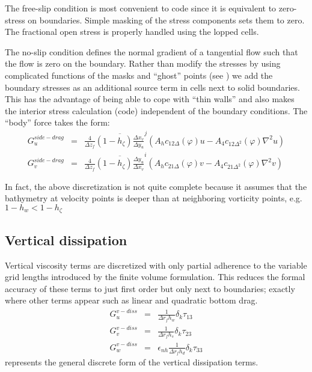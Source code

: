 The free-slip condition is most convenient to code since it is
equivalent to zero-stress on boundaries. Simple masking of the stress
components sets them to zero. The fractional open stress is properly
handled using the lopped cells.

The no-slip condition defines the normal gradient of a tangential flow
such that the flow is zero on the boundary. Rather than modify the
stresses by using complicated functions of the masks and ``ghost''
points (see \cite{adcroft:98}) we add the boundary stresses as
an additional source term in cells next to solid boundaries. This has
the advantage of being able to cope with ``thin walls'' and also makes
the interior stress calculation (code) independent of the boundary
conditions. The ``body'' force takes the form:
\begin{eqnarray}
G_u^{side-drag} & = &
\frac{4}{\Delta z_f} \overline{ (1-h_\zeta) \frac{\Delta x_v}{\Delta y_u} }^j
\left( A_h c_{12\Delta}(\varphi) u - A_4 c_{12\Delta^2}(\varphi) \nabla^2 u \right)
\\
G_v^{side-drag} & = &
\frac{4}{\Delta z_f} \overline{ (1-h_\zeta) \frac{\Delta y_u}{\Delta x_v} }^i
\left( A_h c_{21\Delta}(\varphi) v - A_4 c_{21\Delta^2}(\varphi) \nabla^2 v \right)
\end{eqnarray}

In fact, the above discretization is not quite complete because it
assumes that the bathymetry at velocity points is deeper than at
neighboring vorticity points, e.g. $1-h_w < 1-h_\zeta$



\subsection{Vertical dissipation}

Vertical viscosity terms are discretized with only partial adherence
to the variable grid lengths introduced by the finite volume
formulation. This reduces the formal accuracy of these terms to just
first order but only next to boundaries; exactly where other terms
appear such as linear and quadratic bottom drag.
\begin{eqnarray}
G_u^{v-diss} & = &
\frac{1}{\Delta r_f h_w} \delta_k \tau_{13} \\
G_v^{v-diss} & = &
\frac{1}{\Delta r_f h_s} \delta_k \tau_{23} \\
G_w^{v-diss} & = & \epsilon_{nh}
\frac{1}{\Delta r_f h_d} \delta_k \tau_{33}
\end{eqnarray}
represents the general discrete form of the vertical dissipation terms.

